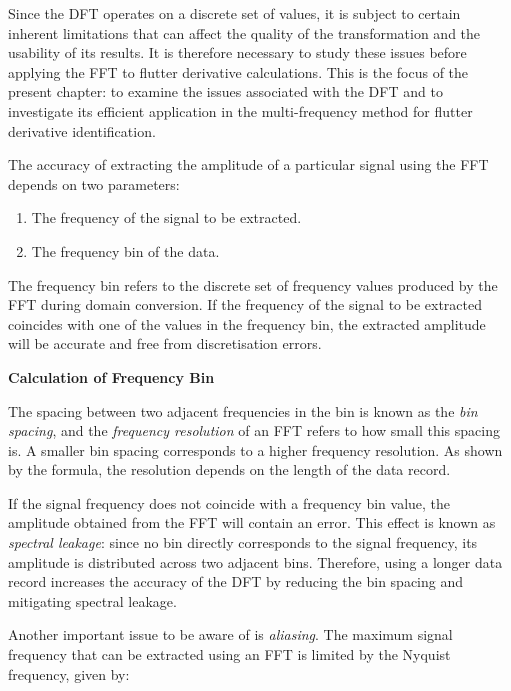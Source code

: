 \documentclass[a4paper, 12pt]{report}
\begin{document}
Since the DFT operates on a discrete set of values, it is subject to certain inherent
limitations that can affect the quality of the transformation and the usability of its results.
It is therefore necessary to study these issues before applying the FFT to flutter derivative
calculations. This is the focus of the present chapter: to examine the issues associated with
the DFT and to investigate its efficient application in the multi-frequency method for flutter
derivative identification.

The accuracy of extracting the amplitude of a particular signal using the FFT depends on two
parameters:

\begin{enumerate}
    \item The frequency of the signal to be extracted.
    \item The frequency bin of the data.
\end{enumerate}

The frequency bin refers to the discrete set of frequency values produced by the FFT during
domain conversion. If the frequency of the signal to be extracted coincides with one of the
values in the frequency bin, the extracted amplitude will be accurate and free from
discretisation errors.

\vspace{0.3cm}
\textbf{Calculation of Frequency Bin}



\vspace{0.3cm}

The spacing between two adjacent frequencies in the bin is known as the \textit{bin spacing},
and the \textit{frequency resolution} of an FFT refers to how small this spacing is. A smaller
bin spacing corresponds to a higher frequency resolution. As shown by the formula, the
resolution depends on the length of the data record.

If the signal frequency does not coincide with a frequency bin value, the amplitude obtained
from the FFT will contain an error. This effect is known as \textit{spectral leakage}: since
no bin directly corresponds to the signal frequency, its amplitude is distributed across two
adjacent bins. Therefore, using a longer data record increases the accuracy of the DFT by
reducing the bin spacing and mitigating spectral leakage.

Another important issue to be aware of is \textit{aliasing}. The maximum signal frequency that
can be extracted using an FFT is limited by the Nyquist frequency, given by:
\end{document}
